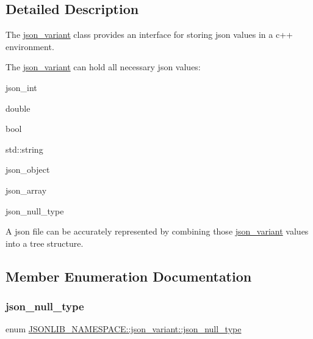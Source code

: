 \subsection{Detailed Description}
The \hyperlink{classJSONLIB__NAMESPACE_1_1json__variant}{json\+\_\+variant} class provides an interface for storing json values in a c++ environment. 

The \hyperlink{classJSONLIB__NAMESPACE_1_1json__variant}{json\+\_\+variant} can hold all necessary json values\+:
\begin{DoxyItemize}
\item json\+\_\+int
\item double
\item bool
\item std\+::string
\item json\+\_\+object
\item json\+\_\+array
\item json\+\_\+null\+\_\+type
\end{DoxyItemize}

A json file can be accurately represented by combining those \hyperlink{classJSONLIB__NAMESPACE_1_1json__variant}{json\+\_\+variant} values into a tree structure. 

\subsection{Member Enumeration Documentation}
\mbox{\label{classJSONLIB__NAMESPACE_1_1json__variant_a1251d2c28258eeebea991ed0b39c3e0c}} 
\subsubsection{\texorpdfstring{json\+\_\+null\+\_\+type}{json\_null\_type}\hspace{0.1cm}{\footnotesize\ttfamily [1/2]}}
{\footnotesize\ttfamily enum \hyperlink{classJSONLIB__NAMESPACE_1_1json__variant_a1251d2c28258eeebea991ed0b39c3e0c}{J\+S\+O\+N\+L\+I\+B\+\_\+\+N\+A\+M\+E\+S\+P\+A\+C\+E\+::json\+\_\+variant\+::json\+\_\+null\+\_\+type}}



